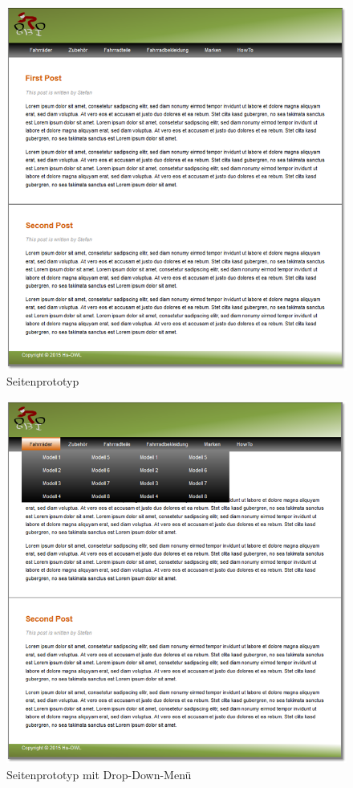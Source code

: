 \begin{figure}[H]
\begin{center}
\includegraphics[width=150mm]{Bilder/Abbildung3-Seitenprototyp.png}
\end{center}
\caption{Seitenprototyp}
\end{figure}


\begin{figure}
\begin{center}
\includegraphics[width=150mm]{Bilder/Abbildung4-SeitenprototypMitDropDownMenue.png}
\end{center}
\caption{Seitenprototyp mit Drop-Down-Menü}
\end{figure}

